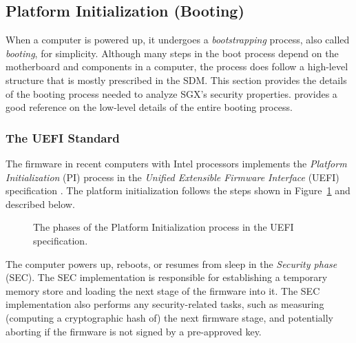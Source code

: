 \subsection{Platform Initialization (Booting)}
\label{sec:booting}

When a computer is powered up, it undergoes a \textit{bootstrapping} process,
also called \textit{booting}, for simplicity. Although many steps in the boot
process depend on the motherboard and components in a computer, the process
does follow a high-level structure that is mostly prescribed in the SDM. This
section provides the details of the booting process needed to analyze SGX's
security properties. \cite{intel2010booting} provides a good reference on the
low-level details of the entire booting process.

\subsubsection{The UEFI Standard}
\label{sec:efi}

The firmware in recent computers with Intel processors implements the
\textit{Platform Initialization} (PI) process in the \textit{Unified
Extensible Firmware Interface} (UEFI) specification \cite{forum2015uefi}. The
platform initialization follows the steps shown in Figure~\ref{fig:uefi} and
described below.

\begin{figure}[hbt]
  \caption{
    The phases of the Platform Initialization process in the UEFI
    specification.
  }
  \label{fig:uefi}
\end{figure}

The computer powers up, reboots, or resumes from sleep in the
\textit{Security phase} (SEC). The SEC implementation is responsible for
establishing a temporary memory store and loading the next stage of the
firmware into it. The SEC implementation also performs any security-related
tasks, such as measuring (computing a cryptographic hash of) the next firmware
stage, and potentially aborting if the firmware is not signed by a pre-approved
key.

